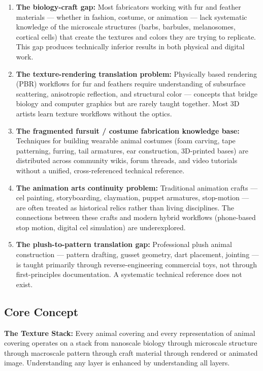 \documentclass[11pt,letterpaper]{article}
\begin{document}
\begin{enumerate}
  \item \textbf{The biology-craft gap:} Most fabricators working with fur and feather materials --- whether in fashion, costume, or animation --- lack systematic knowledge of the microscale structures (barbs, barbules, melanosomes, cortical cells) that create the textures and colors they are trying to replicate. This gap produces technically inferior results in both physical and digital work.

  \item \textbf{The texture-rendering translation problem:} Physically based rendering (PBR) workflows for fur and feathers require understanding of subsurface scattering, anisotropic reflection, and structural color --- concepts that bridge biology and computer graphics but are rarely taught together. Most 3D artists learn texture workflows without the optics.

  \item \textbf{The fragmented fursuit / costume fabrication knowledge base:} Techniques for building wearable animal costumes (foam carving, tape patterning, furring, tail armatures, ear construction, 3D-printed bases) are distributed across community wikis, forum threads, and video tutorials without a unified, cross-referenced technical reference.

  \item \textbf{The animation arts continuity problem:} Traditional animation crafts --- cel painting, storyboarding, claymation, puppet armatures, stop-motion --- are often treated as historical relics rather than living disciplines. The connections between these crafts and modern hybrid workflows (phone-based stop motion, digital cel simulation) are underexplored.

  \item \textbf{The plush-to-pattern translation gap:} Professional plush animal construction --- pattern drafting, gusset geometry, dart placement, jointing --- is taught primarily through reverse-engineering commercial toys, not through first-principles documentation. A systematic technical reference does not exist.
\end{enumerate}

\subsection{Core Concept}

\textbf{The Texture Stack:} Every animal covering and every representation of animal covering operates on a stack from nanoscale biology through microscale structure through macroscale pattern through craft material through rendered or animated image. Understanding any layer is enhanced by understanding all layers.
\end{document}
